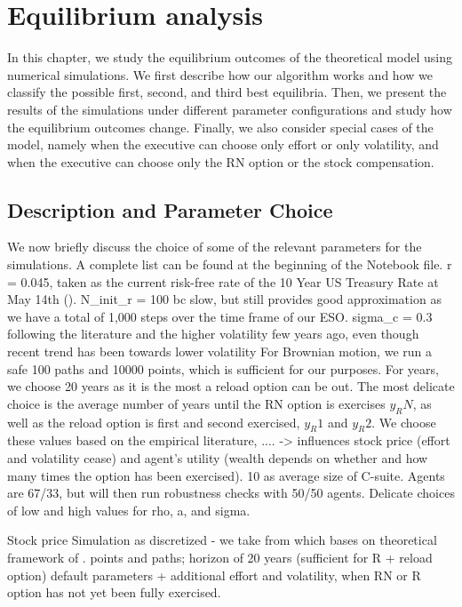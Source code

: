 \section{Equilibrium analysis}
In this chapter, we study the equilibrium outcomes of the theoretical model using numerical simulations. We first describe how our algorithm works and how we classify the possible first, second, and third best equilibria. Then, we present the results of the simulations under different parameter configurations and study how the equilibrium outcomes change. %
Finally, we also consider special cases of the model, namely when the executive can choose only effort or only volatility, and when the executive can choose only the RN option or the stock compensation. %




\subsection*{Description and Parameter Choice}

We now briefly discuss the choice of some of the relevant parameters for the simulations. A complete list can be found at the beginning of the Notebook file. 
r = 0.045, taken as the current risk-free rate of the 10 Year US Treasury Rate at May 14th (\cite{ychartrfrate}).
N\_init\_r = 100 bc slow, but still provides good approximation as we have a total of 1,000 steps over the time frame of our ESO.
sigma_c = 0.3 following the literature and the higher volatility few years ago, even though recent trend has been towards lower volatility
For Brownian motion, we run a safe 100 paths and 10000 points, which is sufficient for our purposes. 
For years, we choose 20 years as it is the most a reload option can be out. The most delicate choice is the average number of years until the RN option is exercises $y_RN$, as well as the reload option is first and second exercised, $y_R1$ and $y_R2$. We choose these values based on the empirical literature, .... -> influences stock price (effort and volatility cease) and agent's utility (wealth depends on whether and how many times the option has been exercised).
10 as average size of C-suite. Agents are 67/33, but will then run robustness checks with 50/50 agents.
Delicate choices of low and high values for rho, a, and sigma.




Stock price Simulation as discretized - we take from \cite{qsbrownianpy} which bases on theoretical framework of \cite{glasserman2004monte}.
    points and paths; horizon of 20 years (sufficient for R + reload option)
    default parameters + additional effort and volatility, when RN or R option has not yet been fully exercised.

